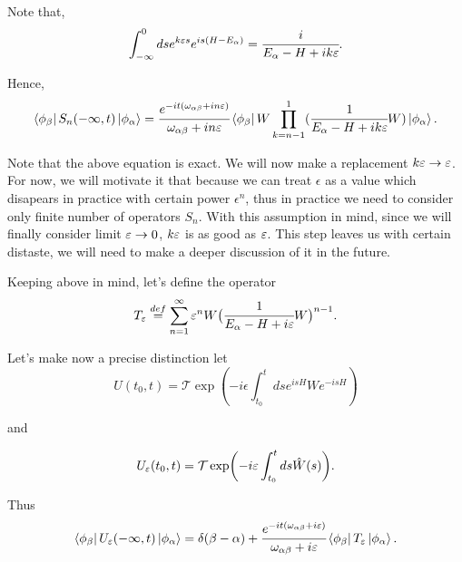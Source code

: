\documentclass[main.tex]{subfiles}
\begin{document}
Note that,
\begin{equation}
 \int^0_{-\infty} ds e^{k\eepsilon s} e^{is(H - E_{\alpha})} = \cfrac{i}{E_\alpha - H + ik\eepsilon}.
\end{equation} 

Hence,
\begin{equation}
\bra{\phi_\beta}S_n (-\infty, t) \ket{\phi_\alpha} = \\
\cfrac{e^{-it(\omega_{\alpha\beta} +in\eepsilon)}}{\omega_{\alpha\beta}+in\eepsilon }
\bra{\phi_\beta} W \prod_{k = n - 1}^1 (\cfrac{1}{E_\alpha - H + ik\eepsilon}W) \ket{\phi_\alpha}.\\
\end{equation}

Note that the above equation is exact. We will now make a replacement $k\eepsilon \to \eepsilon$. For now, we will motivate it that because we can treat $\epsilon$ as a value which disapears in practice with certain power $\epsilon^n$, thus in practice we need to consider only finite number of operators $S_n$. With this assumption in mind, since we will finally consider limit $\eepsilon \to 0$, $k\eepsilon$ is as good as $\eepsilon$. This step leaves us with certain distaste, we will need to make a deeper discussion of it in the future.

Keeping above in mind, let's define the operator
\begin{equation}
\label{transition-operator}
T_{\eepsilon}  \stackrel{def}{=}  \sum_{n = 1}^\infty \epsilon^n W \big(\cfrac{1}{E_\alpha - H + i\eepsilon}W\big)^{n - 1}.
\end{equation}

Let's make now a precise distinction let
\begin{equation}
U(t_0, t) = \mathcal{T} \exp(-i\epsilon \int_{t_0}^t ds e^{isH}W e^{-isH})
\end{equation}

and

\begin{equation}
U_\eepsilon(t_0, t) = \mathcal{T} \exp(-i\epsilon \int_{t_0}^t ds \hat{W}(s)).
\end{equation}

Thus
\begin{equation}
\bra{\phi_\beta}U_\eepsilon (-\infty, t) \ket{\phi_\alpha} = \delta(\beta - \alpha) + \cfrac{e^{-it(\omega_{\alpha\beta} +i\eepsilon)}}{\omega_{\alpha\beta}+i\eepsilon } \bra{\phi_\beta}T_{\eepsilon} \ket{\phi_\alpha}.
\end{equation}
\end{document}
